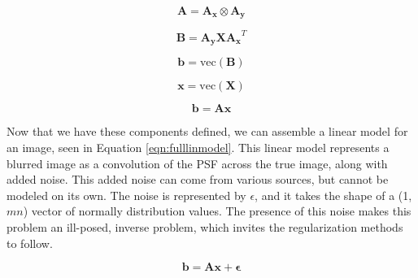 \documentclass[letterpaper, 10pt, titlepage, twocolumn]{article}
\begin{document}
\begin{equation}
  \label{eqn:kron}
  \mathbf{A} = \mathbf{A_x} \otimes \mathbf{A_y}
\end{equation}

\begin{equation}
  \label{eqn:kronvec}
  \mathbf{B} = \mathbf{A_y}\mathbf{X}\mathbf{A_x}^T
\end{equation}

\begin{equation*}
  \mathbf{b} = \textrm{vec}(\mathbf{B})
\end{equation*}

\begin{equation*}
  \mathbf{x} = \textrm{vec}(\mathbf{X})
\end{equation*}

\begin{equation}
  \label{eqn:linmodel}
  \mathbf{b} = \mathbf{A}\mathbf{x}
\end{equation}

Now that we have these components defined, we can assemble a linear model for an image, seen in Equation \eqref{eqn:fulllinmodel}. This linear model represents a blurred image as a convolution of the PSF across the true image, along with added noise. This added noise can come from various sources, but cannot be modeled on its own. The noise is represented by $\epsilon$, and it takes the shape of a (1, $mn$) vector of normally distribution values. The presence of this noise makes this problem an ill-posed, inverse problem, which invites the regularization methods to follow. 

\begin{equation}
  \label{eqn:fulllinmodel}
  \mathbf{b} = \mathbf{A}\mathbf{x} + \mathbf{\epsilon}
\end{equation}
\end{document}

